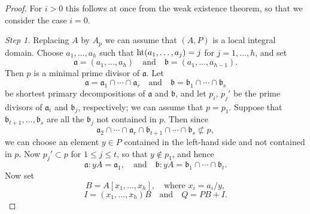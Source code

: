 \begin{proof}
For $i > 0$ this follows at once from the weak existence theorem, so that we
consider the case $i = 0$.

\textit{Step 1.} Replacing $A$ by $A_p$ we can assume that $(A, P)$ is a local integral
domain. Choose $a_1, \ldots, a_h$ such that $\operatorname{ht}(a_1, \ldots, a_j) = j$ for $j = 1, \ldots, h$,
and set
\[
  \mathfrak{a} = (a_1, \ldots, a_h) \quad \text{and} \quad \mathfrak{b} = (a_1, \ldots, a_{h-1}).
\]
Then $p$ is a minimal prime divisor of $\mathfrak{a}$. Let
\[
  \mathfrak{a} = \mathfrak{a}_1 \cap \cdots \cap \mathfrak{a}_r \quad \text{and} \quad
  \mathfrak{b} = \mathfrak{b}_1 \cap \cdots \cap \mathfrak{b}_s
\]
be shortest primary decompositions of $\mathfrak{a}$ and $\mathfrak{b}$, and let $p_i$, $p_j'$ be the
prime divisors of $\mathfrak{a}_i$ and $\mathfrak{b}_j$, respectively; we can assume that
$p = p_1$. Suppose that $\mathfrak{b}_{t+1}, \ldots, \mathfrak{b}_s$ are all the $\mathfrak{b}_j$ not contained
in $p$. Then since
\[
  \mathfrak{a}_2 \cap \cdots \cap \mathfrak{a}_r \cap \mathfrak{b}_{t+1} \cap \cdots \cap
      \mathfrak{b}_s \not\subset p,
\]
we can choose an element $y \in P$ contained in the left-hand side and not
contained in $p$. Now $p_j' \subset p$ for $1 \le j \le t$, so that $y \notin p_1$, and hence
\[
  \mathfrak{a} : yA = \mathfrak{a}_1, \quad \text{and} \quad
  \mathfrak{b} : yA = \mathfrak{b}_1 \cap \cdots \cap \mathfrak{b}_t.
\]
Now set
\[
  B = A[x_1, \ldots, x_h], \quad \text{where } x_i = a_i/y,
\]
\[
  I = (x_1, \ldots, x_h)B \quad \text{and} \quad Q = PB + I.
\]


\end{proof}
